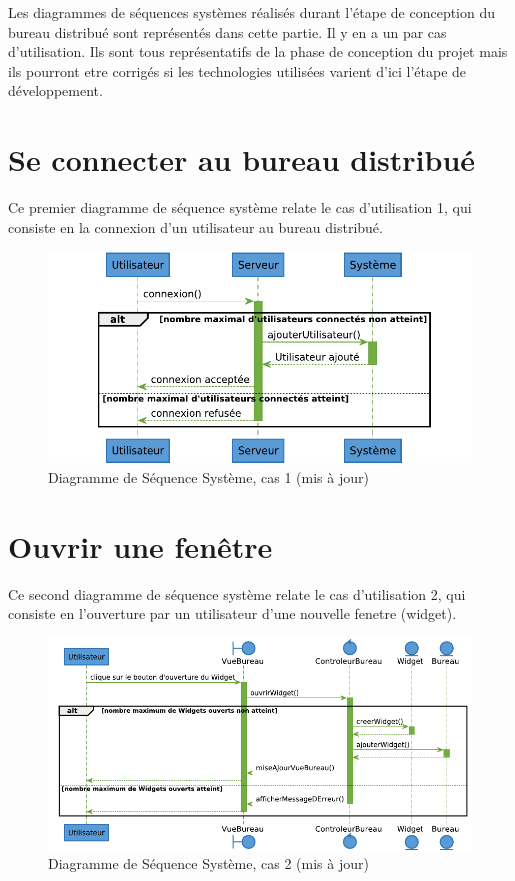 Les diagrammes de séquences systèmes réalisés durant l'étape
de conception du bureau distribué sont représentés dans cette 
partie. Il y en a un par cas d'utilisation. 
Ils sont tous représentatifs de la phase de conception du projet
mais ils pourront etre corrigés si les technologies utilisées
varient d'ici l'étape de développement.

\section{Se connecter au bureau distribué}

Ce premier diagramme de séquence système relate le cas d'utilisation
1, qui consiste en la connexion d'un utilisateur au bureau distribué.

\begin{figure}[h!]
	\centering
	\includegraphics[scale=0.3]{diagrammes/dss1.pdf}
	\caption{\color{green}Diagramme de Séquence Système, cas 1 (mis à jour)\color{black}}
\end{figure}

\section{Ouvrir une fenêtre}

Ce second diagramme de séquence système relate le cas d'utilisation
2, qui consiste en l'ouverture par un utilisateur d'une nouvelle 
fenetre (widget).

\begin{figure}[h!]
	\centering
	\includegraphics[scale=0.5]{diagrammes/dss2.pdf}
	\caption{\color{green}Diagramme de Séquence Système, cas 2 (mis à jour)\color{black}}
\end{figure}
\newpage
